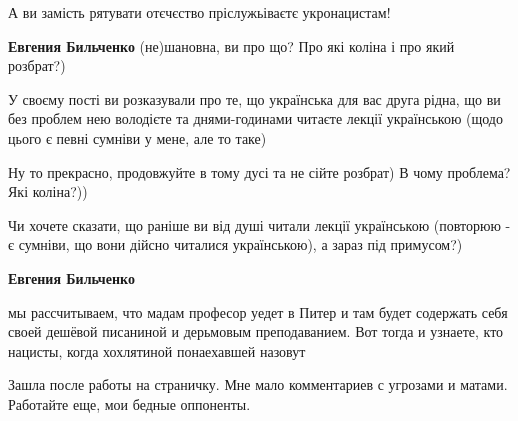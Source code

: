 \begin{itemize}
А ви замість рятувати отєчєство пріслужьіваєтє укронацистам!


\textbf{Евгения Бильченко} (не)шановна, ви про що? Про які коліна і про який розбрат?)

У своєму пості ви розказували про те, що українська для вас друга рідна, що ви
без проблем нею володієте та днями-годинами читаєте лекції українською (щодо
цього є певні сумніви у мене, але то таке)

Ну то прекрасно, продовжуйте в тому дусі та не сійте розбрат) В чому проблема? Які коліна?))

Чи хочете сказати, що раніше ви від душі читали лекції українською (повторюю -
є сумніви, що вони дійсно читалися українською), а зараз під примусом?)



\textbf{Евгения Бильченко} 

мы рассчитываем, что мадам професор уедет в Питер и там будет содержать себя
своей дешёвой писаниной и дерьмовым преподаванием. Вот тогда и узнаете, кто
нацисты, когда хохлятиной понаехавшей назовут
\end{itemize}



Зашла после работы на страничку. Мне мало комментариев с угрозами и матами.
Работайте еще, мои бедные оппоненты.

